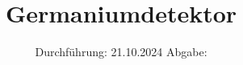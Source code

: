 

\subject{V18}
\title{Germaniumdetektor}
\date{%
  Durchführung: 21.10.2024
  \hspace{3em}
  Abgabe:
}



\maketitle
\thispagestyle{empty}
\tableofcontents
\newpage







\printbibliography{}





